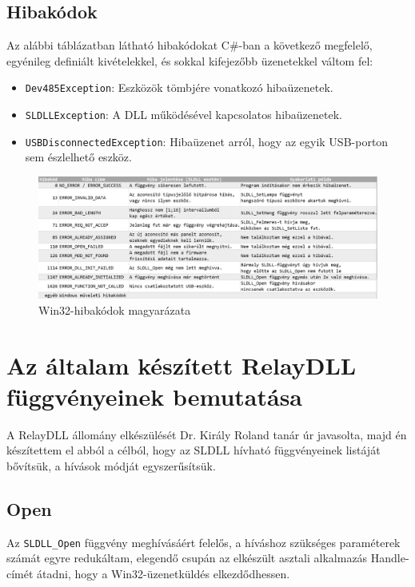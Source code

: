 \documentclass[tocnopagenum]{thesis-ekf}
\theoremstyle{definition}
\theoremstyle{remark}
\begin{document}
	\subsection{Hibakódok}
	Az alábbi táblázatban látható hibakódokat C\#-ban a következő megfelelő, egyénileg definiált kivételekkel, és sokkal kifejezőbb üzenetekkel váltom fel:
	\begin{itemize}
		\item \verb*|Dev485Exception|: Eszközök tömbjére vonatkozó hibaüzenetek.
		\item \verb*|SLDLLException|: A DLL működésével kapcsolatos hibaüzenetek.
		\item \verb*|USBDisconnectedException|: Hibaüzenet arról, hogy az egyik USB-porton sem észlelhető eszköz.
	\end{itemize}
	\begin{figure}[h!]
		\centering
		\hspace*{-0.5in}
		\includegraphics[scale=0.5]{images/errcodes.png}
		\caption[Hibakódok és magyarázataik]{Win32-hibakódok magyarázata}
		\label{fig:errcodes}
	\end{figure}
	\section{Az általam készített RelayDLL függvényeinek bemutatása}
	A RelayDLL állomány elkészülését Dr. Király Roland tanár úr javasolta, majd én készítettem el abból a célból, hogy az SLDLL hívható függvényeinek listáját bővítsük, a hívások módját egyszerűsítsük.
	
	\subsection{Open} Az \verb*|SLDLL_Open| függvény meghívásáért felelős, a híváshoz szükséges paraméterek számát egyre redukáltam, elegendő csupán az elkészült asztali alkalmazás Handle-címét átadni, hogy a Win32-üzenetküldés elkezdődhessen.
	
\end{document}
